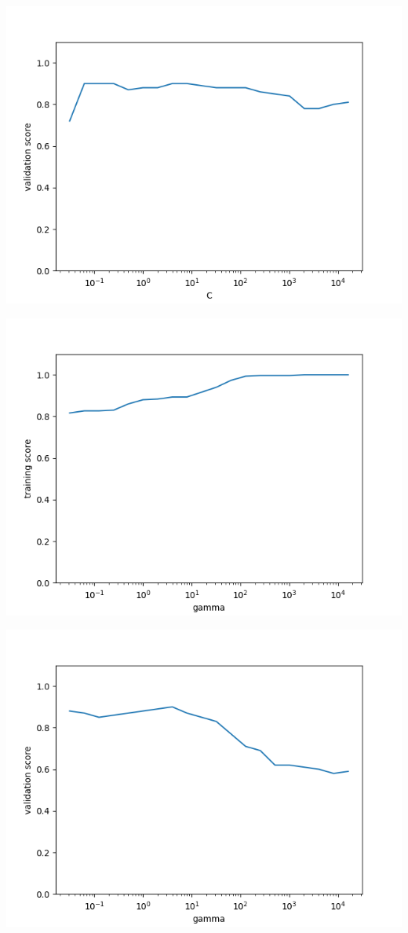\documentclass[a4paper]{article}
\begin{document}
	\centerline{\includegraphics[width=1\textwidth]{dataset_3_validation_C_scores}}  
	
	\centerline{\includegraphics[width=1\textwidth]{dataset_3_train_gamma_scores}}  
	
	\centerline{\includegraphics[width=1\textwidth]{dataset_3_validation_gamma_scores}}  
	
\end{document}
